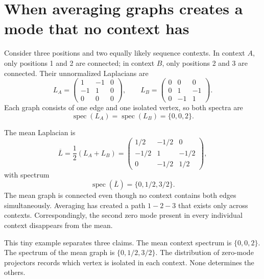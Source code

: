 \section*{When averaging graphs creates a mode that no context has}

Consider three positions and two equally likely sequence contexts.  In context $A$, only positions
1 and 2 are connected; in context $B$, only positions 2 and 3 are connected.  Their unnormalized
Laplacians are
\begin{equation}
L_A=
\begin{pmatrix}
1&-1&0\\
-1&1&0\\
0&0&0
\end{pmatrix},
\qquad
L_B=
\begin{pmatrix}
0&0&0\\
0&1&-1\\
0&-1&1
\end{pmatrix}.
\label{eq:book-context-laplacians}
\end{equation}
Each graph consists of one edge and one isolated vertex, so both spectra are
\begin{equation}
\operatorname{spec}(L_A)
=\operatorname{spec}(L_B)
=\{0,0,2\}.
\end{equation}

The mean Laplacian is
\begin{equation}
\overline L
=\frac12(L_A+L_B)
=\begin{pmatrix}
1/2&-1/2&0\\
-1/2&1&-1/2\\
0&-1/2&1/2
\end{pmatrix},
\end{equation}
with spectrum
\begin{equation}
\operatorname{spec}(\overline L)=\{0,1/2,3/2\}.
\label{eq:book-mean-laplacian-spectrum}
\end{equation}
The mean graph is connected even though no context contains both edges simultaneously.  Averaging
has created a path $1\!-\!2\!-\!3$ that exists only across contexts.  Correspondingly, the second
zero mode present in every individual context disappears from the mean.

This tiny example separates three claims.  The mean context spectrum is $\{0,0,2\}$.  The spectrum
of the mean graph is $\{0,1/2,3/2\}$.  The distribution of zero-mode projectors records which vertex
is isolated in each context.  None determines the others.

